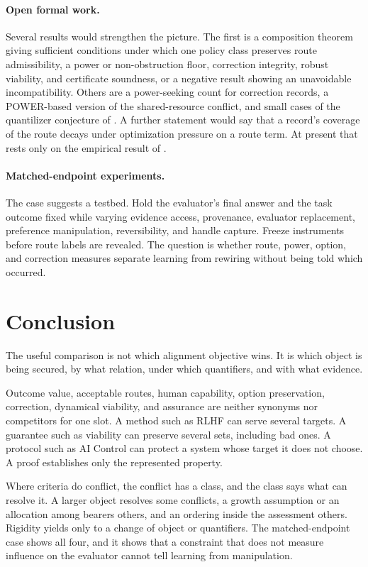 \documentclass[11pt]{article}
\begin{document}
\paragraph{Open formal work.}
Several results would strengthen the picture.
The first is a composition theorem giving sufficient conditions under which one policy class preserves route admissibility, a power or non-obstruction floor, correction integrity, robust viability, and certificate soundness, or a negative result showing an unavoidable incompatibility.
Others are a power-seeking count for correction records, a POWER-based version of the shared-resource conflict, and small cases of the quantilizer conjecture of \textcite[Conjecture~B.13]{turner2022retargetable}.
A further statement would say that a record's coverage of the route decays under optimization pressure on a route term.
At present that rests only on the empirical result of \textcite{baker2025monitoring}.

\paragraph{Matched-endpoint experiments.}
The case suggests a testbed.
Hold the evaluator's final answer and the task outcome fixed while varying evidence access, provenance, evaluator replacement, preference manipulation, reversibility, and handle capture.
Freeze instruments before route labels are revealed.
The question is whether route, power, option, and correction measures separate learning from rewiring without being told which occurred.

\section{Conclusion}
\label{sec:conclusion}

The useful comparison is not which alignment objective wins.
It is which object is being secured, by what relation, under which quantifiers, and with what evidence.

Outcome value, acceptable routes, human capability, option preservation, correction, dynamical viability, and assurance are neither synonyms nor competitors for one slot.
A method such as RLHF can serve several targets.
A guarantee such as viability can preserve several sets, including bad ones.
A protocol such as AI Control can protect a system whose target it does not choose.
A proof establishes only the represented property.

Where criteria do conflict, the conflict has a class, and the class says what can resolve it.
A larger object resolves some conflicts, a growth assumption or an allocation among bearers others, and an ordering inside the assessment others.
Rigidity yields only to a change of object or quantifiers.
The matched-endpoint case shows all four, and it shows that a constraint that does not measure influence on the evaluator cannot tell learning from manipulation.
\end{document}
